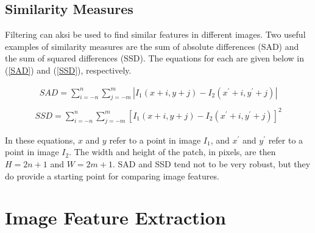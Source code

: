 \documentclass[twoside]{article}
\begin{document}
\subsection{Similarity Measures}
Filtering can aksi be used to find similar features in different images. Two useful examples of similarity measures are the sum of absolute differences (SAD) and the sum of squared differences (SSD). The equations for each are given below in (\ref{SAD}) and (\ref{SSD}), respectively.

\begin{equation}
  \label{SAD}
  \begin{aligned}
    SAD = \sum_{i=-n}^n \sum_{j=-m}^m |I_1(x+i,y+j)-I_2(x^\prime+i,y^\prime+j)|\\
  \end{aligned}
\end{equation}
\begin{equation}
  \label{SSD}
  \begin{aligned}
  SSD = \sum_{i=-n}^n \sum_{j=-m}^m [I_1(x+i,y+j)-I_2(x^\prime+i,y^\prime+j)]^2
  \end{aligned}
\end{equation}

In these equations, $x$ and $y$ refer to a point in image $I_1$, and $x^\prime$ and $y^\prime$ refer to a point in image $I_2$.
The width and height of the patch, in pixels, are then $H = 2n+1$ and $W = 2m+1$. SAD and SSD tend not to be very robust, but they do provide a starting point for comparing image features.






\section{Image Feature Extraction}
\end{document}
